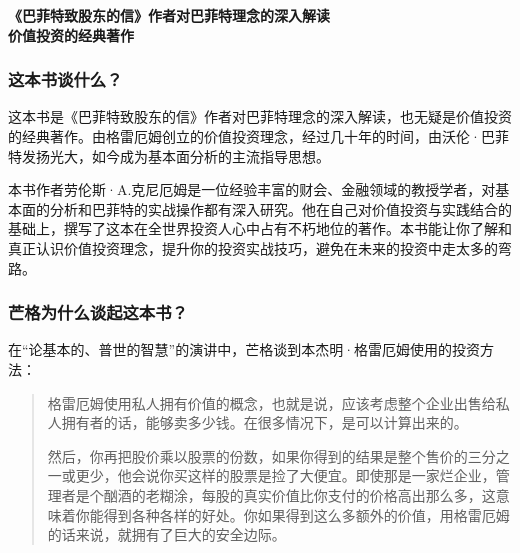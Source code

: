 \cleardoublepage
{}


\begin{BookSummaryBox}
{\centering \textbf{《巴菲特致股东的信》作者对巴菲特理念的深入解读\\ 价值投资的经典著作}\par}
\end{BookSummaryBox}

\subsubsection*{这本书谈什么？}

这本书是《巴菲特致股东的信》作者对巴菲特理念的深入解读，也无疑是价值投资的经典著作。由格雷厄姆创立的价值投资理念，经过几十年的时间，由沃伦·巴菲特发扬光大，如今成为基本面分析的主流指导思想。
\par

本书作者劳伦斯·A.克尼厄姆是一位经验丰富的财会、金融领域的教授学者，对基本面的分析和巴菲特的实战操作都有深入研究。他在自己对价值投资与实践结合的基础上，撰写了这本在全世界投资人心中占有不朽地位的著作。本书能让你了解和真正认识价值投资理念，提升你的投资实战技巧，避免在未来的投资中走太多的弯路。
\par

\subsubsection*{芒格为什么谈起这本书？}

在“论基本的、普世的智慧”的演讲中，芒格谈到本杰明·格雷厄姆使用的投资方法：
\par

\begin{quotation}
格雷厄姆使用私人拥有价值的概念，也就是说，应该考虑整个企业出售给私人拥有者的话，能够卖多少钱。在很多情况下，是可以计算出来的。
\par

然后，你再把股价乘以股票的份数，如果你得到的结果是整个售价的三分之一或更少，他会说你买这样的股票是捡了大便宜。即使那是一家烂企业，管理者是个酗酒的老糊涂，每股的真实价值比你支付的价格高出那么多，这意味着你能得到各种各样的好处。你如果得到这么多额外的价值，用格雷厄姆的话来说，就拥有了巨大的安全边际。
\par
\end{quotation}

